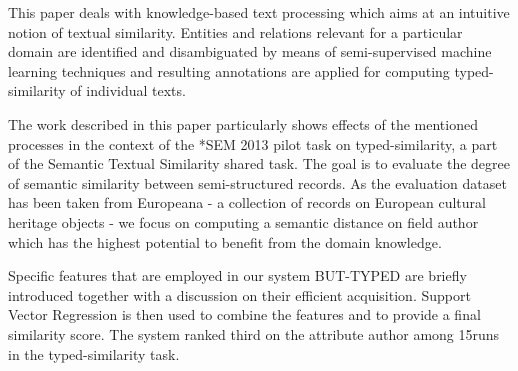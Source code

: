 This paper deals with knowledge-based text processing which aims at an intuitive notion of textual similarity. Entities and relations relevant for a
 particular domain are identified and disambiguated by means of semi-supervised
 machine learning techniques and resulting annotations are applied for computing
 typed-similarity of individual texts.
 
 The work described in this paper particularly shows effects of the mentioned
 processes in the context of the *SEM 2013 pilot task on typed-similarity, a
 part of the Semantic Textual Similarity shared task. The goal is to evaluate
 the degree of semantic similarity between semi-structured records. As the
 evaluation dataset has been taken from Europeana - a collection of records on
 European cultural heritage objects - we focus on computing a semantic distance
 on field author which has the highest potential to benefit from the domain
 knowledge.
 
 Specific features that are employed in our system BUT-TYPED are briefly
 introduced together with a discussion on their efficient acquisition. Support
 Vector Regression is then used to combine the features and to provide a final
 similarity score. The system ranked third on the attribute author among
 15\textasciitildesubmitted runs in the typed-similarity task.

